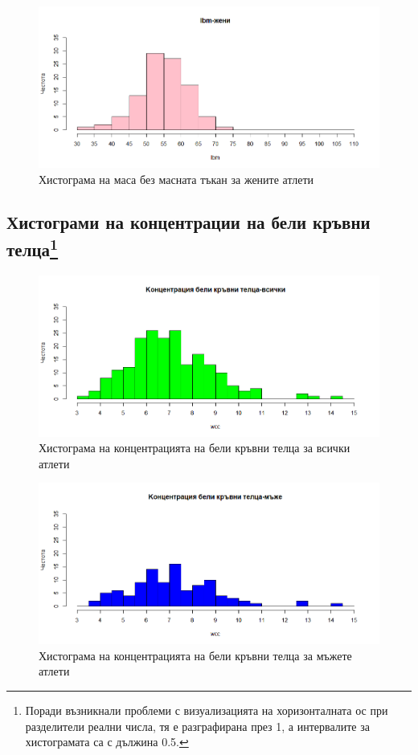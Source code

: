 \documentclass[12pt]{article}
\begin{document}
\begin{large}
\begin{figure}[h!]
\includegraphics[width=\textwidth,height=\textheight,keepaspectratio]{pics/lbmwomen}
\caption{Хистограма на маса без масната тъкан за жените атлети}
\end{figure}

\FloatBarrier
\subsection[Хистограми на концентрации на бели кръвни телца]{Хистограми на концентрации на бели кръвни телца\footnote{Поради възникнали проблеми с визуализацията на хоризонталната ос при разделители реални числа, тя е разграфирана през 1, а интервалите за хистограмата са с дължина 0.5.}}
\FloatBarrier

\begin{figure}[h!]
\includegraphics[width=\textwidth,height=\textheight,keepaspectratio]{pics/wccall}
\caption{Хистограма на концентрацията на бели кръвни телца за всички атлети}
\end{figure}

\begin{figure}[h!]
\includegraphics[width=\textwidth,height=\textheight,keepaspectratio]{pics/wccmen}
\caption{Хистограма на концентрацията на бели кръвни телца за мъжете атлети}
\end{figure}


\end{large}
\end{document}
